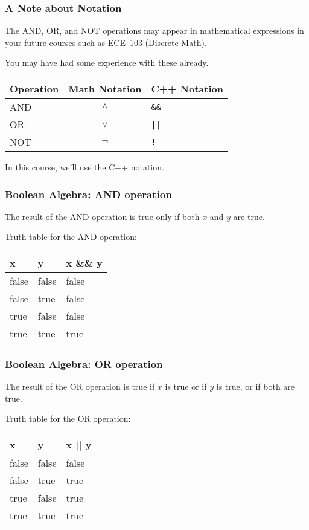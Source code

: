 \begin{frame}
\frametitle{A Note about Notation}

The AND, OR, and NOT operations may appear in mathematical expressions in your future courses such as ECE~103 (Discrete Math).

You may have had some experience with these already. 

\begin{center}
\begin{tabular}{l|c|l}
	\textbf{Operation} & \textbf{Math Notation} & \textbf{C++ Notation} \\ \hline
	AND & $\wedge$ & \texttt{\&\&} \\ \hline
	OR  & $\vee$ & \texttt{||} \\ \hline
	NOT & $\neg$ & \texttt{!} \\
\end{tabular}
\end{center}

In this course, we'll use the C++ notation. 

\end{frame}


\begin{frame}
\frametitle{Boolean Algebra: AND operation}

The result of the AND operation is true only if both $x$ and $y$ are true.

Truth table for the AND operation:

\begin{center}
\begin{tabular}{l|l|l}
	\textbf{x} & \textbf{y} & \textbf{x \&\& y}\\ \hline
	false & false & false \\ \hline
	false & true & false \\ \hline
	true & false & false \\ \hline
	true & true & true \\ 
\end{tabular}
\end{center}

\end{frame}

\begin{frame}
\frametitle{Boolean Algebra: OR operation}


The result of the OR operation is true if $x$ is true or if $y$ is true, or if both are true.

Truth table for the OR operation:

\begin{center}
\begin{tabular}{l|l|l}
	\textbf{x} & \textbf{y} & \textbf{x || y}\\ \hline
	false & false & false \\ \hline
	false & true & true \\ \hline
	true & false & true \\ \hline
	true & true & true \\ 
\end{tabular}
\end{center}

\end{frame}


